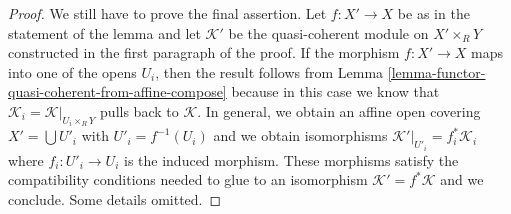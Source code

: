 \documentclass[10pt,a4paper]{amsart}
\theoremstyle{plain}
\theoremstyle{definition}
\theoremstyle{remark}
\numberwithin{equation}{subsection}
\begin{document}
\begin{proof}
\medskip\noindent
We still have to prove the final assertion. Let $f : X' \to X$
be as in the statement of the lemma and let $\mathcal{K}'$
be the quasi-coherent module on $X' \times_R Y$ constructed
in the first paragraph of the proof. If the morphism
$f : X' \to X$ maps into one of the opens $U_i$, then the
result follows from
Lemma \ref{lemma-functor-quasi-coherent-from-affine-compose}
because in this case we know
that $\mathcal{K}_i = \mathcal{K}|_{U_i \times_R Y}$
pulls back to $\mathcal{K}$. In general, we obtain an
affine open covering $X' = \bigcup U'_i$ with $U'_i = f^{-1}(U_i)$
and we obtain isomorphisms
$\mathcal{K}'|_{U'_i} = f_i^*\mathcal{K}_i$ where
$f_i : U'_i \to U_i$ is the induced morphism.
These morphisms satisfy the compatibility conditions needed
to glue to an isomorphism $\mathcal{K}' = f^*\mathcal{K}$
and we conclude. Some details omitted.
\end{proof}
\end{document}
